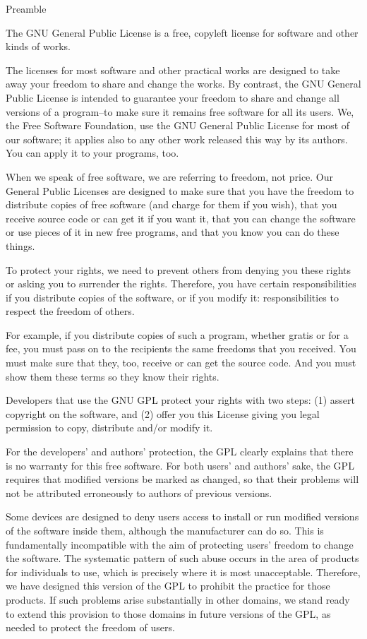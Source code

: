 \documentclass[10pt]{book}
\begin{document}
\begin{center}
{\Large \sc Preamble}
\end{center}
The GNU General Public License is a free, copyleft license for
software and other kinds of works.

The licenses for most software and other practical works are designed
to take away your freedom to share and change the works.  By contrast,
the GNU General Public License is intended to guarantee your freedom to
share and change all versions of a program--to make sure it remains free
software for all its users.  We, the Free Software Foundation, use the
GNU General Public License for most of our software; it applies also to
any other work released this way by its authors.  You can apply it to
your programs, too.

When we speak of free software, we are referring to freedom, not
price.  Our General Public Licenses are designed to make sure that you
have the freedom to distribute copies of free software (and charge for
them if you wish), that you receive source code or can get it if you
want it, that you can change the software or use pieces of it in new
free programs, and that you know you can do these things.

To protect your rights, we need to prevent others from denying you
these rights or asking you to surrender the rights.  Therefore, you have
certain responsibilities if you distribute copies of the software, or if
you modify it: responsibilities to respect the freedom of others.

For example, if you distribute copies of such a program, whether
gratis or for a fee, you must pass on to the recipients the same
freedoms that you received.  You must make sure that they, too, receive
or can get the source code.  And you must show them these terms so they
know their rights.

Developers that use the GNU GPL protect your rights with two steps:
(1) assert copyright on the software, and (2) offer you this License
giving you legal permission to copy, distribute and/or modify it.

For the developers' and authors' protection, the GPL clearly explains
that there is no warranty for this free software.  For both users' and
authors' sake, the GPL requires that modified versions be marked as
changed, so that their problems will not be attributed erroneously to
authors of previous versions.

Some devices are designed to deny users access to install or run
modified versions of the software inside them, although the manufacturer
can do so.  This is fundamentally incompatible with the aim of
protecting users' freedom to change the software.  The systematic
pattern of such abuse occurs in the area of products for individuals to
use, which is precisely where it is most unacceptable.  Therefore, we
have designed this version of the GPL to prohibit the practice for those
products.  If such problems arise substantially in other domains, we
stand ready to extend this provision to those domains in future versions
of the GPL, as needed to protect the freedom of users.
\end{document}
